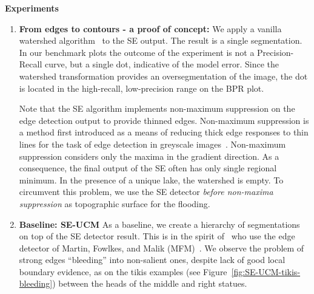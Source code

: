 \textbf{Experiments}
\begin{enumerate}
\item{\bf From edges to contours - a proof of concept:}
 We apply a vanilla watershed algorithm~\cite{beucher1992morphological,najman1996geodesic,PINKlibrary} to the SE output. The result is a single segmentation. %
 In our benchmark plots the outcome of the experiment is not a Precision-Recall curve, but a single dot, indicative of the model error. Since the watershed transformation provides an oversegmentation of the image, the dot is located in the high-recall, low-precision range on the BPR plot.
 
 Note that the SE algorithm implements non-maximum suppression on the edge detection output to provide thinned edges. Non-maximum suppression is a method first introduced as a means of reducing thick edge responses to thin lines for the task of edge detection in greyscale images~\cite{rosenfeld1976digital}. Non-maximum suppression considers only the maxima in the gradient direction. As a consequence, the final output of the SE often has only single regional minimum. In the presence of a unique lake, the watershed is empty. To circumvent this problem, we use the SE detector \textit{before non-maxima suppression} as topographic surface for the flooding.

\item{\bf Baseline: SE-UCM}
 As a baseline, we create a hierarchy of segmentations on top of the SE detector result. This is in the spirit of~\cite{arbelaez2006boundary} who use the edge detector of Martin, Fowlkes, and Malik (MFM)~\cite{martin2004learning}.
 We observe the problem of strong edges ``bleeding'' into non-salient ones, despite lack of good local boundary evidence, as on the tikis examples (see Figure~\ref{fig:SE-UCM-tikis-bleeding}) between the heads of the middle and right statues.


\end{enumerate}
